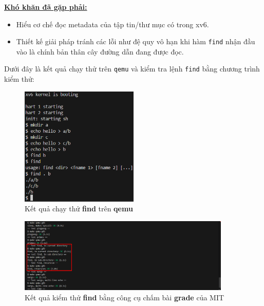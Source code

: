\underline{\textbf{Khó khăn đã gặp phải:}}
\begin{itemize}[labelindent=1em, labelsep=0.2cm, leftmargin=1cm, wide=\parindent, topsep=0.1cm, itemsep=-1ex, partopsep=1.5ex, parsep=1.5ex]
	\item Hiểu cơ chế đọc metadata của tập tin/thư mục có trong xv6.
	\item Thiết kế giải pháp tránh các lỗi như đệ quy vô hạn khi hàm \verb|find| nhận đầu vào là chính bản thân cây đường dẫn đang được đọc.
\end{itemize}
\newpage
Dưới đây là kết quả chạy thử trên \verb|qemu| và kiểm tra lệnh \verb|find| bằng chương trình kiểm thử:
\begin{figure}[htp!]
	\centering
	\includegraphics[width=0.5\textwidth]{figures/exec-find}
	\caption{Kết quả chạy thử \textbf{find} trên \textbf{qemu}}
\end{figure}
\begin{figure}[htp!]
	\centering
	\includegraphics[width=0.9\textwidth]{figures/find-test}
	\caption{Kết quả kiểm thử \textbf{find} bằng công cụ chấm bài \textbf{grade} của MIT}
\end{figure}